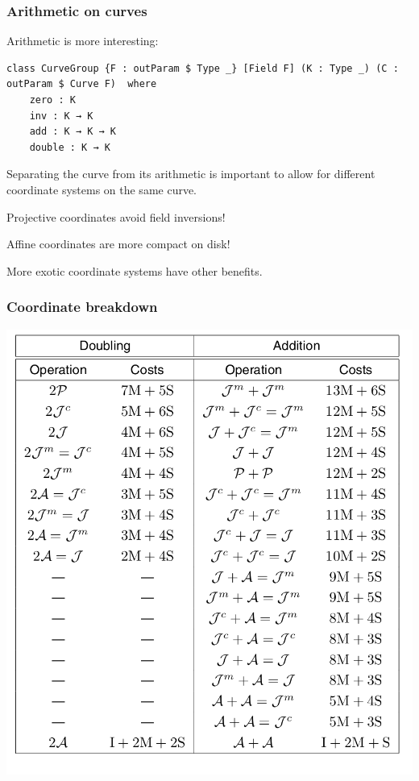 \documentclass[options]{beamer}
\begin{document}
\begin{frame}[fragile]
    \frametitle{Arithmetic on curves}

    Arithmetic is more interesting:
    
    \begin{verbatim}
class CurveGroup {F : outParam $ Type _} [Field F] (K : Type _) (C : outParam $ Curve F)  where 
    zero : K
    inv : K → K
    add : K → K → K
    double : K → K
    \end{verbatim}
    
    Separating the curve from its arithmetic is important to allow for different coordinate systems on the same curve.
    
    Projective coordinates avoid field inversions!

    Affine coordinates are more compact on disk!

    More exotic coordinate systems have other benefits.

\end{frame}

\begin{frame}
    \frametitle{Coordinate breakdown}
    \begin{center}
    \includegraphics[height = .75\textheight]{img/coordinate_breakdown.png}
    \end{center}
\end{frame}
\end{document}
